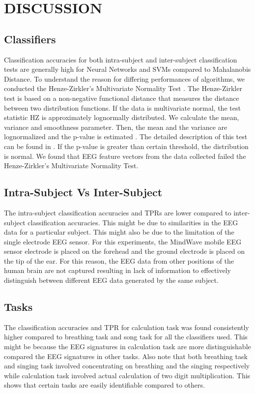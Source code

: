 \chapter{DISCUSSION}
\label{chap-five}

	\section{Classifiers}
		Classification accuracies for both intra-subject and inter-subject classification tests are generally high for Neural Networks and SVMs compared to Mahalanobis Distance. To understand the reason for differing performances of algorithms, we conducted the Henze-Zirkler's Multivariate Normality Test \cite{HZ} \cite{HZart}. The Henze-Zirkler test is based on a non-negative functional distance that measures the distance between two distribution functions. If the data is multivariate normal, the test statistic HZ is approximately lognormally distributed. We calculate the mean, variance and smoothness parameter. Then, the mean and the variance are lognormalized and the p-value is estimated \cite{HZart}. The detailed description of this test can be found in \cite{HZtext}. If the p-value is greater than certain threshold, the distribution is normal. We found that EEG feature vectors from the data collected failed the Henze-Zirkler's Multivariate Normality Test.
        
	\section{Intra-Subject Vs Inter-Subject}
		The intra-subject classification accuracies and TPRs are lower compared to inter-subject classification accuracies. This might be due to similarities in the EEG data for a particular subject. This might also be due to the limitation of the single electrode EEG sensor. For this experiments, the MindWave mobile EEG sensor electrode is placed on the forehead and the ground electrode is placed on the tip of the ear. For this reason, the EEG data from other positions of the human brain are not captured resulting in lack of information to effectively distinguish between different EEG data generated by the same subject. 
	
    \section{Tasks}
    	The classification accuracies and TPR for calculation task was found consistently higher compared to breathing task and song task for all the classifiers used. This might be because the EEG signatures in calculation task are more distinguishable compared the EEG signatures in other tasks. Also note that both breathing task and singing task involved concentrating on breathing and the singing respectively while calculation task involved actual calculation of two digit multiplication. This shows that certain tasks are easily identifiable compared to others.

